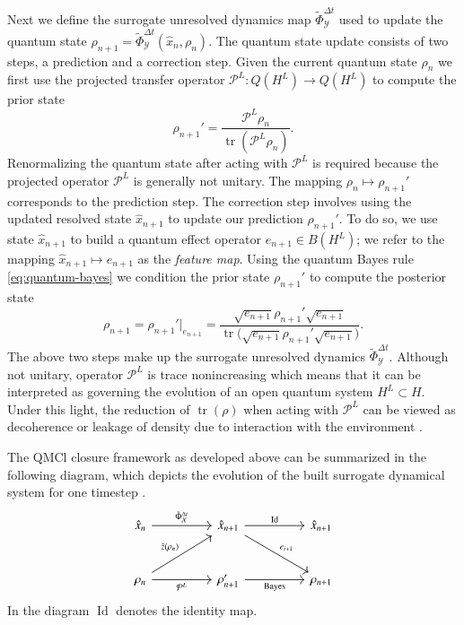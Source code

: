 \documentclass[letterpaper,10pt,3p,preprint]{elsarticle}
\newcommand{\Xcal}{\mathcal{X}}
\newcommand{\Ycal}{\mathcal{Y}}
\newcommand{\Pcal}{\mathcal{P}}
\DeclareMathOperator{\tr}{tr}
\DeclareMathOperator{\Id}{Id}
\begin{document}
Next we define the surrogate unresolved dynamics map
$\tilde{\Phi}_\Ycal^{\Delta t}$
used to update the quantum state
$\rho_{n+1}=\tilde{\Phi}_\Ycal^{\Delta t}(\hat{x}_n,\rho_n)$.
The quantum state update consists of two steps, a prediction and a
correction step.
Given the current quantum state $\rho_n$ we first use the
projected transfer operator
$\Pcal^L\colon Q(H^L)\rightarrow Q(H^L)$
to compute the prior state
\begin{equation*}
    \rho_{n+1}'=\frac{\Pcal^L\rho_n}
        {\tr{(\Pcal^L\rho_n)}}.
\end{equation*}
Renormalizing the quantum state after acting with $\Pcal^L$
is required because the projected operator $\Pcal^L$
is generally not unitary.
The mapping $\rho_n\mapsto\rho_{n+1}'$ corresponds to the prediction step.
The correction step involves using the updated resolved state
$\hat{x}_{n+1}$ to update our prediction $\rho_{n+1}'$.
To do so, we use state $\hat{x}_{n+1}$ to build a quantum
effect operator $e_{n+1}\in B(H^L)$;
we refer to the mapping $\hat{x}_{n+1}\mapsto e_{n+1}$ as the
\emph{feature map}.
Using the quantum Bayes rule \eqref{eq:quantum-bayes} we condition
the prior state $\rho_{n+1}'$ to compute the posterior state
\begin{equation*}
    \rho_{n+1}=\rho_{n+1}'|_{e_{n+1}}=
        \frac{\sqrt{e_{n+1}}\rho_{n+1}'\sqrt{e_{n+1}}}
        {\tr{(\sqrt{e_{n+1}}\rho_{n+1}'\sqrt{e_{n+1}}})}.
\end{equation*}
The above two steps make up the surrogate unresolved dynamics
$\tilde{\Phi}_\Ycal^{\Delta t}$.
Although not unitary, operator $\Pcal^L$ is trace nonincreasing
which means that it can be interpreted as governing the evolution
of an open quantum system $H^L\subset H$.
Under this light, the reduction of $\tr(\rho)$ when acting with
$\Pcal^L$ can be viewed as decoherence or leakage of density
due to interaction with the environment
\cite{Hall2013,Sakurai2021,Takhtajan2008}.

The QMCl closure framework as developed above can be summarized
in the following diagram, which depicts the evolution of the
built surrogate dynamical system for one timestep
\cite{Freeman2024}.
\begin{equation*}
\begin{tikzcd}[column sep=huge, row sep=large]
    \hat{x}_n\arrow[r,"\tilde{\Phi}_\Xcal^{\Delta t}"]
        &\hat{x}_{n+1}\arrow[r,"\Id"]\arrow[rd,"e_{i+1}"] &\hat{x}_{n+1}\\
    \rho_n\arrow[ru,"\tilde{z}(\rho_n)"]\arrow[r,"\Pcal^L"']
        &\rho_{n+1}'\arrow[r,"\text{Bayes}"'] &\rho_{n+1}
\end{tikzcd}
\end{equation*}
In the diagram $\Id$ denotes the identity map.
\end{document}
